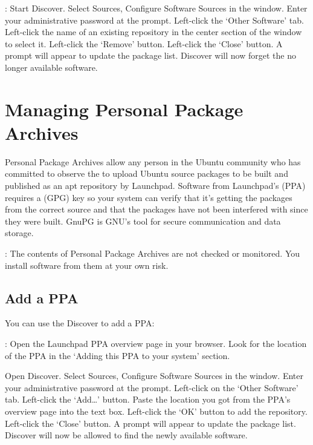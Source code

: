 \documentclass[letterpaper,10pt,english]{sphinxmanual}
\begin{document}
: Start Discover. Select Sources, Configure Software Sources in the window. Enter your administrative password at the prompt. Left-click the ‘Other Software’ tab. Left-click the name of an existing repository in the center section of the window to select it. Left-click the ‘Remove’ button. Left-click the ‘Close’ button. A prompt will appear to update the package list. Discover will now forget the no longer available software.


\section{Managing Personal Package Archives}
\label{\detokenize{docs/repositories:managing-personal-package-archives}}\label{\detokenize{docs/repositories:ppa-link}}
Personal Package Archives allow any person in the Ubuntu community who has committed to observe the  to upload Ubuntu source packages to be built and published as an apt repository by Launchpad. Software from Launchpad’s  (PPA) requires a  (GPG) key so your system can verify that it’s getting the packages from the correct source and that the packages have not been interfered with since they were built. GnuPG is GNU’s tool for secure communication and data storage.

: The contents of Personal Package Archives are not checked or monitored. You install software from them at your own risk.


\subsection{Add a PPA}
\label{\detokenize{docs/repositories:add-a-ppa}}
You can use the Discover to add a PPA:

: Open the Launchpad PPA overview page in your browser. Look for the location of the PPA in the ‘Adding this PPA to your system’ section.

Open Discover. Select Sources, Configure Software Sources in the window. Enter your administrative password at the prompt. Left-click on the ‘Other Software’ tab. Left-click the ‘Add…’ button. Paste the location you got from the PPA’s overview page into the text box. Left-click the ‘OK’ button to add the repository. Left-click the ‘Close’ button. A prompt will appear to update the package list. Discover will now be allowed to find the newly available software.
\end{document}
